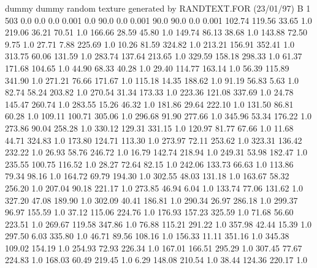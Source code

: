 dummy
dummy
random texture generated by RANDTEXT.FOR (23/01/97)
B   1    503
      0.0     0.0    0.0     0.001
      0.0    90.0    0.0     0.001
     90.0    90.0    0.0     0.001
    102.74    119.56     33.65  1.0
    219.06     36.21     70.51  1.0
    166.66     28.59     45.80  1.0
    149.74     86.13     38.68  1.0
    143.88     72.50      9.75  1.0
     27.71      7.88    225.69  1.0
     10.26     81.59    324.82  1.0
    213.21    156.91    352.41  1.0
    313.75     60.06    131.59  1.0
    283.74    137.64    213.65  1.0
    329.59    158.18    298.33  1.0
     61.37    171.68    104.65  1.0
     44.90     68.33     40.28  1.0
     29.40    114.77    163.14  1.0
     56.39    115.89    341.90  1.0
    271.21     76.66    171.67  1.0
    115.18     14.35    188.62  1.0
     91.19     56.83      5.63  1.0
     82.74     58.24    203.82  1.0
    270.54     31.34    173.33  1.0
    223.36    121.08    337.69  1.0
     24.78    145.47    260.74  1.0
    283.55     15.26     46.32  1.0
    181.86     29.64    222.10  1.0
    131.50     86.81     60.28  1.0
    109.11    100.71    305.06  1.0
    296.68     91.90    277.66  1.0
    345.96     53.34    176.22  1.0
    273.86     90.04    258.28  1.0
    330.12    129.31    331.15  1.0
    120.97     81.77     67.66  1.0
     11.68     44.71    324.83  1.0
    173.80    124.71    113.30  1.0
    273.97     72.11    253.62  1.0
    323.31    136.42    232.22  1.0
     26.93     58.76    246.72  1.0
     16.79    142.74    218.94  1.0
    249.31     53.98    182.47  1.0
    235.55    100.75    116.52  1.0
     28.27     72.64     82.15  1.0
    242.06    133.73     66.63  1.0
    113.86     79.34     98.16  1.0
    164.72     69.79    194.30  1.0
    302.55     48.03    131.18  1.0
    163.67     58.32    256.20  1.0
    207.04     90.18    221.17  1.0
    273.85     46.94      6.04  1.0
    133.74     77.06    131.62  1.0
    327.20     47.08    189.90  1.0
    302.09     40.41    186.81  1.0
    290.34     26.97    286.18  1.0
    299.37     96.97    155.59  1.0
     37.12    115.06    224.76  1.0
    176.93    157.23    325.59  1.0
     71.68     56.60    223.51  1.0
    269.67    119.58    347.86  1.0
     76.88    115.21    291.22  1.0
    357.98     42.44     15.39  1.0
    297.50      6.03    335.80  1.0
     46.71     89.56    108.16  1.0
    156.33     11.11    351.16  1.0
    345.38    109.02    154.19  1.0
    254.93     72.93    226.34  1.0
    167.01    166.51    295.29  1.0
    307.45     77.67    224.83  1.0
    168.03     60.49    219.45  1.0
      6.29    148.08    210.54  1.0
     38.44    124.36    220.17  1.0
